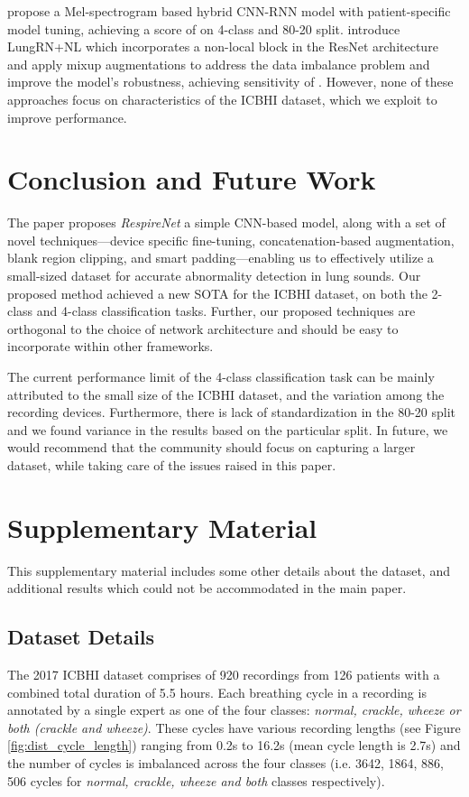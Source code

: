 \documentclass{article}
\newcommand{\method}{\textit{RespireNet}}
\begin{document}
\citet{acharya_20} propose a Mel-spectrogram based hybrid CNN-RNN model with patient-specific model tuning, achieving a score of  on 4-class and 80-20 split. \citet{lungrn_20} introduce LungRN+NL which incorporates a non-local block in the ResNet architecture and apply mixup augmentations to address the data imbalance problem and improve the model's robustness, achieving sensitivity of .
However, none of these approaches focus on characteristics of the ICBHI dataset, which we exploit to improve performance.
 \vspace{-2mm}
\section{Conclusion and Future Work}
\vspace{-2mm}

The paper proposes \method{} a simple CNN-based model, along with a set of novel techniques---device specific fine-tuning, concatenation-based augmentation, blank region clipping, and smart padding---enabling us to effectively utilize a small-sized dataset for accurate abnormality detection in lung sounds. Our proposed method achieved a new SOTA for the ICBHI dataset, on both the 2-class and 4-class classification tasks. Further, our proposed techniques are orthogonal to the choice of network architecture and should be easy to incorporate within other frameworks.

The current performance limit of the 4-class classification task can be mainly attributed to the small size of the ICBHI dataset, and the variation among the recording devices. Furthermore, there is lack of standardization in the 80-20 split and we found variance in the results based on the particular split. In future, we would recommend that the community should focus on capturing a larger dataset, while taking care of the issues raised in this paper. 
\clearpage

{\small

}

\clearpage
\section{Supplementary Material}
This supplementary material includes some other details about the dataset, and additional results which could not be accommodated in the main paper.

\subsection{Dataset Details}
The 2017 ICBHI dataset \cite{icbhi_17} comprises of 920 recordings from 126 patients with a combined total duration of 5.5 hours. Each breathing cycle in a recording is annotated by a single expert as one of the four classes: \textit{normal, crackle, wheeze or both (crackle and wheeze)}. These cycles have various recording lengths (see Figure \ref{fig:dist_cycle_length}) ranging from 0.2s to 16.2s (mean cycle length is 2.7s) and the number of cycles is imbalanced across the four classes (i.e. 3642, 1864, 886, 506 cycles for \textit{normal, crackle, wheeze and both} classes respectively).
\end{document}
